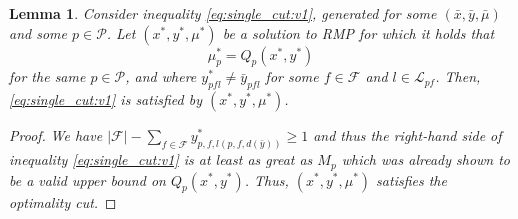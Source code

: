 \documentclass[12pt]{article}
\newtheorem{lemma}[theorem]{Lemma}%
\theoremstyle{thmstylethree}%
\newcommand{\mtc}[1] {\mathcal{#1}}
\begin{document}
\begin{lemma}
  \label{lem:valid_cut_case_2}
  Consider inequality \eqref{eq:single_cut:v1}, generated for some $(\bar{x},\bar{y},\bar{\mu})$ and some $p\in\mathcal{P}$.
  Let $(x^*,y^*,\mu^*)$ be a solution to RMP for which it holds that
  $$\mu^*_p = Q_{p}(x^*,y^*)$$
  for the same $p\in\mtc{P}$, and where $y_{pfl}^* \neq \bar{y}_{pfl}$ for some  $f \in \mathcal{F}$ and $l \in \mathcal{L}_{pf}$.
  Then, \eqref{eq:single_cut:v1} is satisfied by $(x^*,y^*,\mu^*)$.
\end{lemma}
\begin{proof}
  \itshape
We have $\vert \mathcal{F} \vert - \sum_{f \in \mathcal{F}} y^{*}_{p,f,l(p,f,d(\bar{y}))} \geq 1$ and thus the right-hand side of inequality \eqref{eq:single_cut:v1} is at least as great as $M_{p}$ which was already shown to be a valid upper bound on $Q_{p}(x^{*},y^{*})$. Thus, $(x^*,y^*,\mu^*)$ satisfies the optimality cut.

\end{proof}
\end{document}
